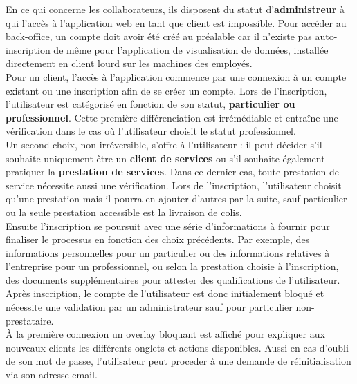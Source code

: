 \documentclass{report}
\begin{document}
\noindent En ce qui concerne les collaborateurs, ils disposent du statut d'\textbf{administreur} à qui l'accès à l'application web en tant que client est impossible. Pour accéder au back-office, un compte doit avoir été créé au préalable car il n'existe pas auto-inscription de même pour l'application de visualisation de données, installée directement en client lourd sur les machines des employés. \\

\noindent Pour un client, l'accès à l'application commence par une connexion à un compte existant ou une inscription afin de se créer un compte. Lors de l'inscription, l'utilisateur est catégorisé en fonction de son statut, \textbf{particulier ou professionnel}. Cette première différenciation est irrémédiable et entraîne une vérification dans le cas où l'utilisateur choisit le statut professionnel. \\

\noindent Un second choix, non irréversible, s'offre à l'utilisateur : il peut décider s'il souhaite uniquement être un \textbf{client de services} ou s'il souhaite également pratiquer la \textbf{prestation de services}. Dans ce dernier cas, toute prestation de service nécessite aussi une vérification. Lors de l'inscription, l'utilisateur choisit qu'une prestation mais il pourra en ajouter d'autres par la suite, sauf particulier ou la seule prestation accessible est la livraison de colis. \\

\noindent Ensuite l'inscription se poursuit avec une série d'informations à fournir pour finaliser le processus en fonction des choix précédents. Par exemple, des informations personnelles pour un particulier ou des informations relatives à l'entreprise pour un professionnel, ou selon la prestation choisie à l'inscription, des documents supplémentaires pour attester des qualifications de l'utilisateur. Après inscription, le compte de l'utilisateur est donc initialement bloqué et nécessite une validation par un administrateur sauf pour particulier non-prestataire. \\

\noindent À la première connexion un overlay bloquant est affiché pour expliquer aux nouveaux clients les différents onglets et actions disponibles. Aussi en cas d'oubli de son mot de passe, l'utilisateur peut proceder à une demande de réinitialisation via son adresse email. \\
\end{document}
